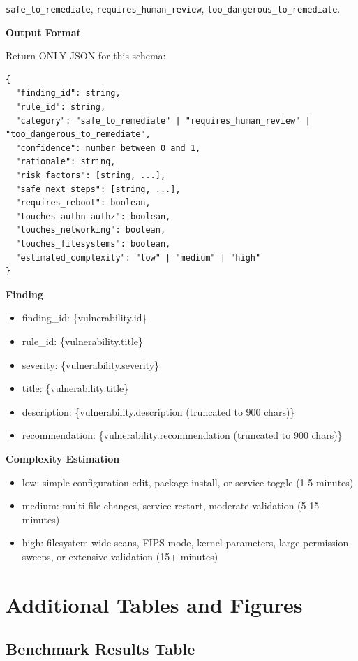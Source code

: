 \documentclass[pdflatex,sn-mathphys-num]{sn-jnl}%
\begin{document}
\begin{appendices}
\begin{promptbox}
\texttt{safe\_to\_remediate}, \texttt{requires\_human\_review}, \texttt{too\_dangerous\_to\_remediate}.

\textbf{Output Format}

Return ONLY JSON for this schema:

\begin{lstlisting}[basicstyle=\ttfamily\small, breaklines=true]
{
  "finding_id": string,
  "rule_id": string,
  "category": "safe_to_remediate" | "requires_human_review" | "too_dangerous_to_remediate",
  "confidence": number between 0 and 1,
  "rationale": string,
  "risk_factors": [string, ...],
  "safe_next_steps": [string, ...],
  "requires_reboot": boolean,
  "touches_authn_authz": boolean,
  "touches_networking": boolean,
  "touches_filesystems": boolean,
  "estimated_complexity": "low" | "medium" | "high"
}
\end{lstlisting}

\textbf{Finding}

\begin{itemize}
\item finding\_id: \{vulnerability.id\}
\item rule\_id: \{vulnerability.title\}
\item severity: \{vulnerability.severity\}
\item title: \{vulnerability.title\}
\item description: \{vulnerability.description (truncated to 900 chars)\}
\item recommendation: \{vulnerability.recommendation (truncated to 900 chars)\}
\end{itemize}

\textbf{Complexity Estimation}

\begin{itemize}
\item low: simple configuration edit, package install, or service toggle (1-5 minutes)
\item medium: multi-file changes, service restart, moderate validation (5-15 minutes)
\item high: filesystem-wide scans, FIPS mode, kernel parameters, large permission sweeps, or extensive validation (15+ minutes)
\end{itemize}
\end{promptbox}





\hspace{2cm}
\section{Additional Tables and Figures}\label{appendix:morestuff}
\subsection{Benchmark Results Table}\label{appendix:results}



\end{appendices}
\end{document}
